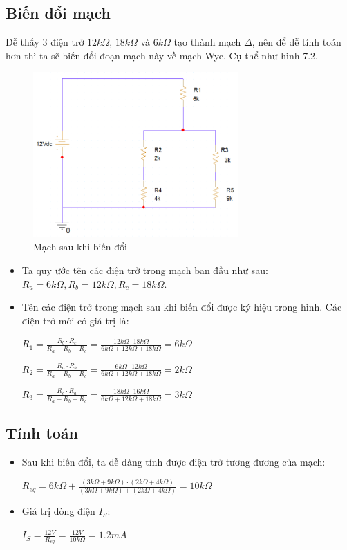 \subsection{Biến đổi mạch}
Dễ thấy 3 điện trở \(12k\Omega\), \(18k\Omega\) và \(6k\Omega\) tạo thành mạch \(\Delta\), nên để dễ tính toán hơn thì ta sẽ biến đổi đoạn mạch này về mạch Wye. Cụ thể như hình 7.2.
\begin{figure}[!htbp]
    \centering
    \includegraphics[width=0.7\textwidth]{graphics/ex7/f2.png}
    \caption{Mạch sau khi biến đổi}
\end{figure}
\begin{itemize}
    \item Ta quy ước tên các điện trở trong mạch ban đầu như sau: \(R_a = 6k\Omega,  R_b = 12k\Omega,  R_c = 18k\Omega\).
    \newpage
    \item Tên các điện trở trong mạch sau khi biến đổi được ký hiệu trong hình. Các điện trở mới có giá trị là:
    
    \(R_1 = \frac{R_b \cdot R_c}{R_a + R_b + R_c} = \frac{12k\Omega \cdot 18k\Omega}{6k\Omega + 12k\Omega + 18k\Omega} = 6k\Omega\)

    \(R_2 = \frac{R_a \cdot R_b}{R_a + R_b + R_c} = \frac{6k\Omega \cdot 12k\Omega}{6k\Omega + 12k\Omega + 18k\Omega} = 2 k\Omega\)

    \(R_3 = \frac{R_c \cdot R_a}{R_a + R_b + R_c} = \frac{18k\Omega \cdot 16k\Omega}{6k\Omega + 12k\Omega + 18k\Omega} = 3k\Omega\)
    
\end{itemize}
\subsection{Tính toán}
\begin{itemize}
    \item Sau khi biến đổi, ta dễ dàng tính được điện trở tương đương của mạch:
    
    \(R_{eq} = 6k\Omega + \frac{(3k\Omega + 9k\Omega) \cdot (2k\Omega + 4k\Omega) }{(3k\Omega + 9k\Omega) + (2k\Omega + 4k\Omega)} = 10k\Omega\)
    \item Giá trị dòng điện \(I_S\):
    
    \(I_S = \frac{12V}{R_{eq}} = \frac{12V}{10k\Omega} = 1.2 mA\)

\end{itemize}
\newpage
